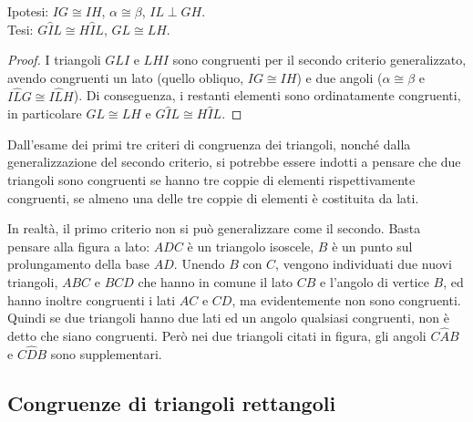 \noindent \begin{minipage}{0.6\textwidth}
  \noindent Ipotesi: $IG\cong IH$, $\alpha\cong \beta$, $IL\perp GH$.\\
  Tesi: $G\widehat{I}L\cong H\widehat{I}L$, $GL\cong LH$.
  
  \begin{proof}
    I triangoli $GLI$ e $LHI$ sono congruenti per il secondo criterio 
    generalizzato, avendo congruenti un lato (quello obliquo, $IG\cong 
    IH$) e due angoli ($\alpha\cong \beta$ e $I\widehat{L}G \cong 
    I\widehat{L}H$). Di conseguenza, i restanti elementi sono 
    ordinatamente congruenti, in particolare $GL\cong LH$ e 
    $G\widehat{I}L\cong H\widehat{I}L$.
  \end{proof}
\end{minipage}\hfil
\begin{minipage}{0.4\textwidth}
  \centering
\end{minipage}

\osservazione Dall'esame dei primi tre criteri di congruenza dei 
triangoli, nonché dalla generalizzazione del secondo criterio, si 
potrebbe essere indotti a pensare che due triangoli sono congruenti 
se hanno tre coppie di elementi rispettivamente congruenti, se almeno 
una delle tre coppie di elementi è costituita da lati.

\noindent \begin{minipage}{0.6\textwidth}
  In realtà, il primo criterio non si può generalizzare come il 
  secondo. Basta pensare alla figura a lato: $ADC$ è un triangolo 
  isoscele, $B$ è un punto sul prolungamento della base $AD$. Unendo $B$ 
  con $C$, vengono individuati due nuovi triangoli, $ABC$ e $BCD$ che 
  hanno in comune il lato $CB$ e l'angolo di vertice $B$, ed hanno 
  inoltre congruenti i lati $AC$ e $CD$, ma evidentemente non sono 
  congruenti. Quindi se due triangoli hanno due lati ed un angolo 
  qualsiasi congruenti, non è detto che siano congruenti. Però nei due 
  triangoli citati in figura, gli angoli $C\widehat{A}B$ e 
  $C\widehat{D}B$ sono supplementari.
\end{minipage}\hfil
\begin{minipage}{0.4\textwidth}
  \centering
\end{minipage}


\subsection{Congruenze di triangoli rettangoli}

